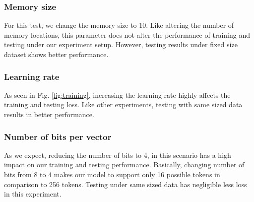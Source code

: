 \documentclass[acmsmall]{acmart}
\begin{document}
\subsubsection{Memory size}
For this test, we change the memory size to 10. Like altering the number of memory locations, this parameter does not alter the performance of training and testing under our experiment setup. However, testing results under fixed size dataset shows better performance.

\subsubsection{Learning rate}
As seen in Fig. \ref{fig:training}, increasing the learning rate highly affects the training and testing loss. Like other experiments, testing with same sized data results in better performance.

\subsubsection{Number of bits per vector}
As we expect, reducing the number of bits to 4, in this scenario has a high impact on our training and testing performance. Basically, changing number of bits from 8 to 4 makes our model to support only 16 possible tokens in comparison to 256 tokens. Testing under same sized data has negligible less loss in this experiment.
\end{document}
